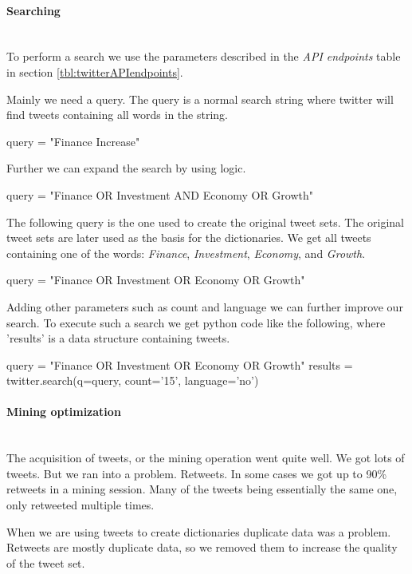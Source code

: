 \paragraph{Searching}
\hspace{0pt}\\
To perform a search we use the parameters described in the \textit{API
endpoints} table in section \ref{tbl:twitterAPIendpoints}.

Mainly we need a query. The query is a normal search string where twitter will
find tweets containing all words in the string. 
\begin{python}
query = "Finance Increase"
\end{python}

Further we can expand the search by using logic. 
\begin{python}
query = "Finance OR Investment AND Economy OR Growth"
\end{python}

The following query is the one used to create the original tweet sets. The
original tweet sets are later used as the basis for the dictionaries.
We get all tweets containing one of the words: \textit{Finance}, \textit{Investment}, \textit{Economy}, and \textit{Growth}.
\begin{python}
query = "Finance OR Investment OR Economy OR Growth"
\end{python}

Adding other parameters such as count and language we can further improve our
search. To execute such a search we get python code like the following, where
'results' is a data structure containing tweets.
\begin{python}
query = "Finance OR Investment OR Economy OR Growth"
results = twitter.search(q=query, count='15', language='no')
\end{python}
%

\paragraph{Mining optimization}
\hspace{0pt}\\
The acquisition of tweets, or the mining operation went quite well. We got lots
of tweets. But we ran into a problem. Retweets. In some cases we got up to 90\%
retweets in a mining session. Many of the tweets being essentially the same
one, only retweeted multiple times. 

When we are using tweets to create dictionaries duplicate data was a problem.
Retweets are mostly duplicate data, so we removed them to increase the quality
of the tweet set.

